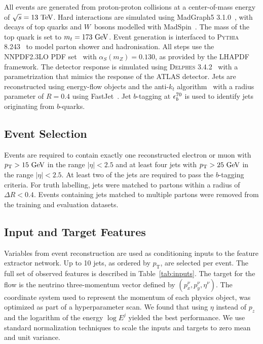 All events are generated from proton-proton collisions at a center-of-mass energy of $\sqrt{s} = 13~\TeV$.
Hard interactions are simulated using MadGraph5 3.1.0~\cite{MadGraph}, with decays of top quarks and $W$~bosons modelled with MadSpin~\cite{MadSpin}.
The mass of the top quark is set to $m_t = 173~\GeV$.
Event generation is interfaced to \textsc{Pythia 8.243}~\cite{Pythia8} to model parton shower and hadronisation.
All steps use the \textsc{NNPDF2.3LO} PDF set~\cite{PDF2.3} with $\alpha_S(m_Z) = 0.130$, as provided by the LHAPDF~\cite{LHAPDF6PartonDensity} framework.
The detector response is simulated using \textsc{Delphes 3.4.2}~\cite{Delphes} with a parametrization that mimics the response of the ATLAS detector.
Jets are reconstructed using energy-flow objects and the anti-$k_t$ algorithm~\cite{AntiKt} with a radius parameter of $R = 0.4$ using FastJet~\cite{FastJet}.
Jet $b$-tagging at $\epsilon_b^{70}$ is used to identify jets originating from $b$-quarks.

\subsection{Event Selection}

Events are required to contain exactly one reconstructed electron or muon with $p_\mathrm{T} > 15~\GeV$ in the range $|\eta|<2.5$ and at least four jets with $\pt > 25~\GeV$ in the range $|\eta|<2.5$.
At least two of the jets are required to pass the $b$-tagging criteria.
For truth labelling, jets were matched to partons within a radius of $\Delta R < 0.4$.
Events containing jets matched to multiple partons were removed from the training and evaluation datasets.

\subsection{Input and Target Features}

Variables from event reconstruction are used as conditioning inputs to the feature extractor network.
Up to 10 jets, as ordered by $p_\mathrm{T}$, are selected per event.
The full set of observed features is described in Table~\ref{tab:inputs}.
The target for the flow is the neutrino three-momentum vector defined by $(p_x^\nu, p_y^\nu, \eta^\nu )$.
The coordinate system used to represent the momentum of each physics object, was optimized as part of a hyperparameter scan.
We found that using $\eta$ instead of $p_z$ and the logarithm of the energy $\log E^j$ yielded the best performance.
We use standard normalization techniques to scale the inputs and targets to zero mean and unit variance.

